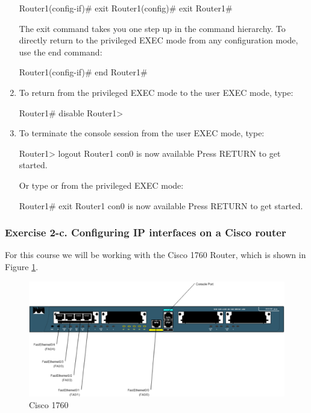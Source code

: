 \begin{enumerate}
		\begin{cmdblock}
	Router1(config-if)# exit 
	Router1(config)# exit 
	Router1#
		\end{cmdblock}
		The exit command takes you one step up in the command hierarchy. To directly return to the privileged EXEC mode from any configuration mode, use the end command:
		\begin{cmdblock}
	Router1(config-if)# end Router1#
		\end{cmdblock}
	\item To return from the privileged EXEC mode to the user EXEC mode, type: 
		\begin{cmdblock}
	Router1# disable
	Router1>
		\end{cmdblock}
	\item To terminate the console session from the user EXEC mode, type: 
		\begin{cmdblock}
	Router1> logout
	Router1 con0 is now available Press RETURN to get started.
		\end{cmdblock}
		Or type  or  from the privileged EXEC mode: 
		\begin{cmdblock}
	Router1# exit
	Router1 con0 is now available Press RETURN to get started.
		\end{cmdblock}
\end{enumerate}

\subsubsection*{Exercise 2-c. Configuring IP interfaces on a Cisco router}

For this course we will be working with the Cisco 1760 Router, which is shown in Figure \ref{fig:cisco1760}.

\begin{figure}[h!t]
    \begin{center}  
      \includegraphics[width=\columnwidth]{graphics/cisco1760.png} 
      \caption{Cisco 1760} \label{fig:cisco1760}
    \end{center}
\end{figure}

